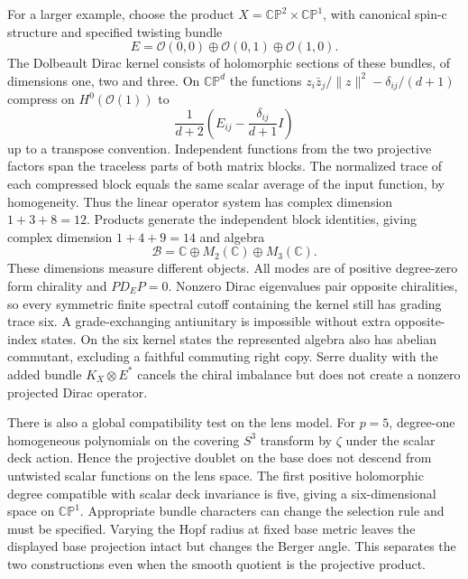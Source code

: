 \documentclass[11pt,oneside]{article}
\newcommand{\C}{\mathbb C}
\newcommand{\CP}{\mathbb{CP}}
\newcommand{\OO}{\mathcal O}
\begin{document}
For a larger example, choose the product \(X=\CP^2\times\CP^1\), with canonical spin-c structure and specified twisting bundle
\[
 E=\OO(0,0)\oplus\OO(0,1)\oplus\OO(1,0).
\]
The Dolbeault Dirac kernel consists of holomorphic sections of these bundles, of dimensions one, two and three. On \(\CP^d\) the functions \(z_i\bar z_j/\|z\|^2-\delta_{ij}/(d+1)\) compress on \(H^0(\OO(1))\) to
\[
 \frac{1}{d+2}\left(E_{ij}-\frac{\delta_{ij}}{d+1}I\right)
\]
up to a transpose convention. Independent functions from the two projective factors span the traceless parts of both matrix blocks. The normalized trace of each compressed block equals the same scalar average of the input function, by homogeneity. Thus the linear operator system has complex dimension \(1+3+8=12\). Products generate the independent block identities, giving complex dimension \(1+4+9=14\) and algebra
\[
 \mathcal B=\C\oplus M_2(\C)\oplus M_3(\C).
\]
These dimensions measure different objects. All modes are of positive degree-zero form chirality and \(PD_EP=0\). Nonzero Dirac eigenvalues pair opposite chiralities, so every symmetric finite spectral cutoff containing the kernel still has grading trace six. A grade-exchanging antiunitary is impossible without extra opposite-index states. On the six kernel states the represented algebra also has abelian commutant, excluding a faithful commuting right copy. Serre duality with the added bundle \(K_X\otimes E^*\) cancels the chiral imbalance but does not create a nonzero projected Dirac operator.

There is also a global compatibility test on the lens model. For \(p=5\), degree-one homogeneous polynomials on the covering \(S^3\) transform by \(\zeta\) under the scalar deck action. Hence the projective doublet on the base does not descend from untwisted scalar functions on the lens space. The first positive holomorphic degree compatible with scalar deck invariance is five, giving a six-dimensional space on \(\CP^1\). Appropriate bundle characters can change the selection rule and must be specified. Varying the Hopf radius at fixed base metric leaves the displayed base projection intact but changes the Berger angle. This separates the two constructions even when the smooth quotient is the projective product.
\end{document}
